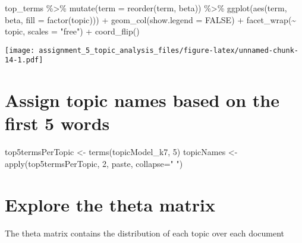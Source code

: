 \documentclass[
]{article}
\newenvironment{Shaded}{\begin{snugshade}}{\end{snugshade}}
\newcommand{\AttributeTok}[1]{\textcolor[rgb]{0.77,0.63,0.00}{#1}}
\newcommand{\ConstantTok}[1]{\textcolor[rgb]{0.00,0.00,0.00}{#1}}
\newcommand{\DecValTok}[1]{\textcolor[rgb]{0.00,0.00,0.81}{#1}}
\newcommand{\FunctionTok}[1]{\textcolor[rgb]{0.00,0.00,0.00}{#1}}
\newcommand{\NormalTok}[1]{#1}
\newcommand{\OtherTok}[1]{\textcolor[rgb]{0.56,0.35,0.01}{#1}}
\newcommand{\SpecialCharTok}[1]{\textcolor[rgb]{0.00,0.00,0.00}{#1}}
\newcommand{\StringTok}[1]{\textcolor[rgb]{0.31,0.60,0.02}{#1}}
\begin{document}
\begin{Shaded}
\begin{Highlighting}[]
\NormalTok{top\_terms }\SpecialCharTok{\%\textgreater{}\%}
  \FunctionTok{mutate}\NormalTok{(}\AttributeTok{term =} \FunctionTok{reorder}\NormalTok{(term, beta)) }\SpecialCharTok{\%\textgreater{}\%}
  \FunctionTok{ggplot}\NormalTok{(}\FunctionTok{aes}\NormalTok{(term, beta, }\AttributeTok{fill =} \FunctionTok{factor}\NormalTok{(topic))) }\SpecialCharTok{+}
  \FunctionTok{geom\_col}\NormalTok{(}\AttributeTok{show.legend =} \ConstantTok{FALSE}\NormalTok{) }\SpecialCharTok{+}
  \FunctionTok{facet\_wrap}\NormalTok{(}\SpecialCharTok{\textasciitilde{}}\NormalTok{ topic, }\AttributeTok{scales =} \StringTok{"free"}\NormalTok{) }\SpecialCharTok{+}
  \FunctionTok{coord\_flip}\NormalTok{()}
\end{Highlighting}
\end{Shaded}

\texttt{[image: assignment\_5\_topic\_analysis\_files/figure-latex/unnamed-chunk-14-1.pdf]}

\hypertarget{assign-topic-names-based-on-the-first-5-words}{%
\section{Assign topic names based on the first 5
words}\label{assign-topic-names-based-on-the-first-5-words}}

\begin{Shaded}
\begin{Highlighting}[]
\NormalTok{top5termsPerTopic }\OtherTok{\textless{}{-}} \FunctionTok{terms}\NormalTok{(topicModel\_k7, }\DecValTok{5}\NormalTok{)}
\NormalTok{topicNames }\OtherTok{\textless{}{-}} \FunctionTok{apply}\NormalTok{(top5termsPerTopic, }\DecValTok{2}\NormalTok{, paste, }\AttributeTok{collapse=}\StringTok{" "}\NormalTok{)}
\end{Highlighting}
\end{Shaded}

\hypertarget{explore-the-theta-matrix}{%
\section{Explore the theta matrix}\label{explore-the-theta-matrix}}

The theta matrix contains the distribution of each topic over each
document
\end{document}
